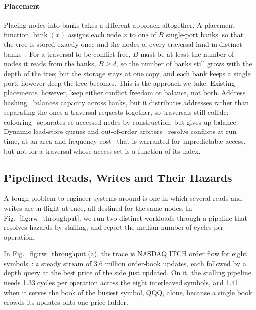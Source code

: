 \paragraph{Placement} Placing nodes into banks takes a different approach
altogether. A placement function $\operatorname{bank}(x)$ assigns each node $x$
to one of $B$ single-port banks, so that the tree is stored exactly once and
the nodes of every traversal land in distinct
banks~\cite{das2000mappings,zhou2017new}. For
a traversal to be conflict-free, $B$ must be at least the number of nodes it
reads from the banks, $B \ge d$, so the number of banks still grows with the
depth of the tree; but the storage stays at one copy, and each bank keeps a
single port, however deep the tree becomes. This is the approach we take.
Existing placements, however, keep either conflict freedom or balance, not both. Address
hashing~\cite{rau1991pseudorandomly,vandenbraak2016configurable} balances
capacity across banks, but it distributes addresses rather than separating the
ones a traversal requests together, so traversals still collide;
colouring~\cite{das2000mappings} separates co-accessed nodes by construction,
but gives up balance. Dynamic load-store queues and out-of-order
arbiters~\cite{josipovic2017outoforder} resolve conflicts at run time, at an
area and frequency cost~\cite{szafarczyk2023compiler} that is warranted for
unpredictable access, but not for a traversal whose access set is a function of
its index.


\subsection{Pipelined Reads, Writes and Their Hazards}\label{sec:mot_rw}
A tough problem to engineer systems around is one in which several reads and
writes are in flight at once, all destined for the same nodes. In
Fig.~\ref{fig:rw_throughput}, we run two distinct workloads through a pipeline
that resolves hazards by stalling, and report the median number of cycles per
operation.

In Fig.~\ref{fig:rw_throughput}(a), the trace is NASDAQ ITCH order flow for
eight symbols~\cite{nasdaq2020itch}: a steady stream of 3.6 million order-book
updates, each followed by a depth query at the best price of the side just
updated. On it, the stalling pipeline needs 1.33 cycles per operation across
the eight interleaved symbols, and 1.41 when it serves the book of the busiest
symbol, QQQ, alone, because a single book crowds its updates onto one price
ladder.

